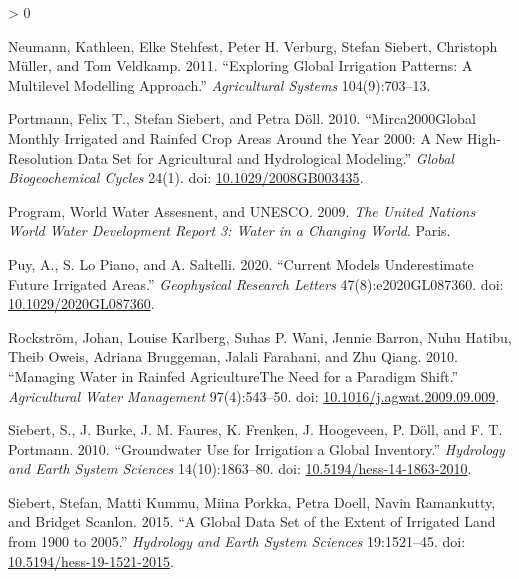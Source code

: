\documentclass[12pt,twoside]{reedthesis}
\newlength{\cslhangindent}
\newenvironment{CSLReferences}[2] %
 {%
  \setlength{\parindent}{0pt}
  \ifodd #1 \everypar{\setlength{\hangindent}{\cslhangindent}}\ignorespaces\fi
  \ifnum #2 > 0
  \setlength{\parskip}{#2\baselineskip}
  \fi
 }%
 {}
\begin{document}
\begin{CSLReferences}{1}{0}
\leavevmode\hypertarget{ref-neumannExploringGlobalIrrigation2011}{}%
Neumann, Kathleen, Elke Stehfest, Peter H. Verburg, Stefan Siebert, Christoph Müller, and Tom Veldkamp. 2011. {``Exploring Global Irrigation Patterns: {A} Multilevel Modelling Approach.''} \emph{Agricultural Systems} 104(9):703--13.

\leavevmode\hypertarget{ref-portmannMIRCA2000GlobalMonthly2010a}{}%
Portmann, Felix T., Stefan Siebert, and Petra Döll. 2010. {``{Mirca2000}{{Global}} Monthly Irrigated and Rainfed Crop Areas Around the Year 2000: {A} New High-Resolution Data Set for Agricultural and Hydrological Modeling.''} \emph{Global Biogeochemical Cycles} 24(1). doi: \href{https://doi.org/10.1029/2008GB003435}{10.1029/2008GB003435}.

\leavevmode\hypertarget{ref-worldwaterassesnentprogramUnitedNationsWorld2009}{}%
Program, World Water Assesnent, and UNESCO. 2009. \emph{The {United Nations World Water Development Report} 3: {Water} in a {Changing World}}. {Paris}.

\leavevmode\hypertarget{ref-puyCurrentModelsUnderestimate2020}{}%
Puy, A., S. Lo Piano, and A. Saltelli. 2020. {``Current {Models Underestimate Future Irrigated Areas}.''} \emph{Geophysical Research Letters} 47(8):e2020GL087360. doi: \href{https://doi.org/10.1029/2020GL087360}{10.1029/2020GL087360}.

\leavevmode\hypertarget{ref-rockstromManagingWaterRainfed2010}{}%
Rockström, Johan, Louise Karlberg, Suhas P. Wani, Jennie Barron, Nuhu Hatibu, Theib Oweis, Adriana Bruggeman, Jalali Farahani, and Zhu Qiang. 2010. {``Managing Water in Rainfed Agriculture{{The}} Need for a Paradigm Shift.''} \emph{Agricultural Water Management} 97(4):543--50. doi: \href{https://doi.org/10.1016/j.agwat.2009.09.009}{10.1016/j.agwat.2009.09.009}.

\leavevmode\hypertarget{ref-siebertGroundwaterUseIrrigation2010}{}%
Siebert, S., J. Burke, J. M. Faures, K. Frenken, J. Hoogeveen, P. Döll, and F. T. Portmann. 2010. {``Groundwater Use for Irrigation {} a Global Inventory.''} \emph{Hydrology and Earth System Sciences} 14(10):1863--80. doi: \href{https://doi.org/10.5194/hess-14-1863-2010}{10.5194/hess-14-1863-2010}.

\leavevmode\hypertarget{ref-siebertGlobalDataSet2015}{}%
Siebert, Stefan, Matti Kummu, Miina Porkka, Petra Doell, Navin Ramankutty, and Bridget Scanlon. 2015. {``A Global Data Set of the Extent of Irrigated Land from 1900 to 2005.''} \emph{Hydrology and Earth System Sciences} 19:1521--45. doi: \href{https://doi.org/10.5194/hess-19-1521-2015}{10.5194/hess-19-1521-2015}.


\end{CSLReferences}
\end{document}
